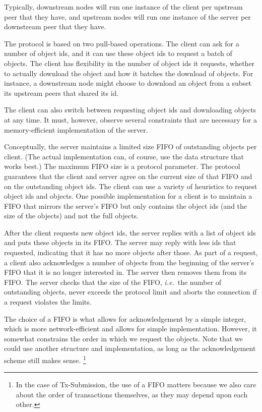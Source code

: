 Typically, downstream nodes will run one instance of the client per upstream
peer that they have, and upstream nodes will run one instance of the server per
downstream peer that they have.

The protocol is based on two pull-based operations. The client can ask for a
number of object ids, and it can use these object ids to request a batch of
objects. The client has flexibility in the number of object ids it requests,
whether to actually download the object and how it batches the download of
objects. For instance, a downstream node might choose to download an object from
a subset its upstream peers that shared its id.

The client can also switch between requesting object ids and downloading objects
at any time. It must, however, observe several constraints that are necessary
for a memory-efficient implementation of the server.

Conceptually, the server maintains a limited size FIFO of outstanding objects
per client. (The actual implementation can, of course, use the data structure
that works best.) The maximum FIFO size is a protocol parameter. The protocol
guarantees that the client and server agree on the current size of that FIFO and
on the outstanding object ids. The client can use a variety of heuristics to
request object ids and objects. One possible implementation for a client is to
maintain a FIFO that mirrors the server's FIFO but only contains the object ids
(and the size of the objects) and not the full objects.

After the client requests new object ids, the server replies with a list of
object ids and puts these objects in its FIFO. The server may reply with less
ids that requested, indicating that it has no more objects after those. As part
of a request, a client also acknowledges a number of objects from the beginning
of the server's FIFO that it is no longer interested in. The server then removes
them from its FIFO. The server checks that the size of the FIFO, {\em i.e.}\ the
number of outstanding objects, never exceeds the protocol limit and aborts the
connection if a request violates the limits.

The choice of a FIFO is what allows for acknowledgement by a simple integer,
which is more network-efficient and allows for simple implementation. However,
it somewhat constrains the order in which we request the objects. Note that we
could use another structure and implementation, as long as the acknowledgement
scheme still makes sense.%
%
\footnote{In the case of Tx-Submission, the use of a FIFO matters because we
also care about the order of transactions themselves, as they may depend upon
each other.}


